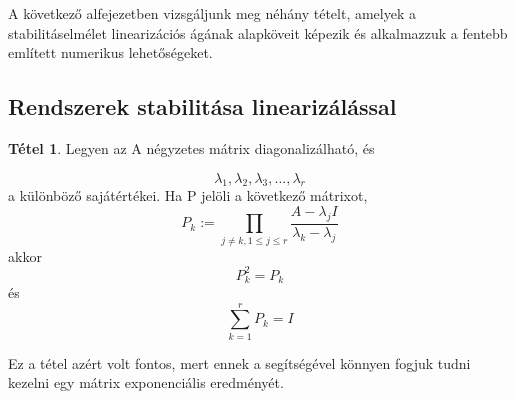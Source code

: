 \documentclass{article}
\theoremstyle{definition}
\theoremstyle{theorem}
\newtheorem{theorem}{Tétel}
\begin{document}
A következő alfejezetben vizsgáljunk meg néhány tételt, amelyek a stabilitáselmélet linearizációs ágának alapköveit képezik és alkalmazzuk a fentebb említett numerikus lehetőségeket.
\subsection{Rendszerek stabilitása linearizálással}

\begin{theorem}
Legyen az A négyzetes mátrix diagonalizálható, és

\begin{equation*}
    \lambda_{1}, \lambda_{2}, \lambda_{3}, ... ,\lambda_{r}
\end{equation*}
a különböző sajátértékei. Ha P jelöli a következő mátrixot,
\begin{equation*}
    P_k := \prod_{j \neq k, 1 \leq j \leq r} \frac{A - \lambda_{j} I} {\lambda_{k} - \lambda_{j}}
\end{equation*}
akkor
\begin{equation*}
    P_k^2 = P_k
\end{equation*}
és
\begin{equation*}
    \sum_{k=1}^r P_k = I
\end{equation*}
\end{theorem}

Ez a tétel azért volt fontos, mert ennek a segítségével könnyen fogjuk tudni kezelni egy mátrix exponenciális eredményét.
\end{document}
